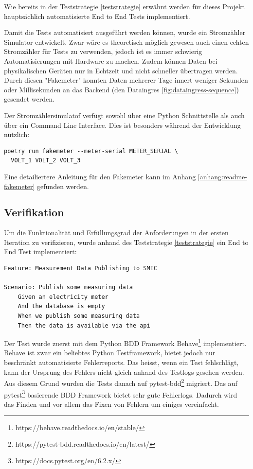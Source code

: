 Wie bereits in der Teststrategie \ref{teststrategie} erwähnt werden für dieses Projekt
hauptsächlich automatisierte End to End Tests implementiert.

Damit die Tests automatisiert ausgeführt werden können, wurde ein Stromzähler Simulator entwickelt.
Zwar wäre es theoretisch möglich gewesen auch einen echten Stromzähler für Tests zu verwenden,
jedoch ist es immer schwierig Automatisierungen mit Hardware zu machen. Zudem können
Daten bei physikalischen Geräten nur in Echtzeit und nicht schneller übertragen werden.
Durch diesen "Fakemeter" konnten Daten mehrerer Tage innert weniger Sekunden oder Millisekunden
an das Backend (den Dataingres \ref{fig:dataingress-sequence}) gesendet werden.

Der Stromzählersimulatof verfügt sowohl über eine Python Schnittstelle als auch über
ein Command Line Interface. Dies ist besonders während der Entwicklung nützlich:

\begin{verbatim}
poetry run fakemeter --meter-serial METER_SERIAL \
  VOLT_1 VOLT_2 VOLT_3
\end{verbatim}

Eine detailiertere Anleitung für den Fakemeter kann im Anhang \ref{anhang:readme-fakemeter}
gefunden werden.

\subsection{Verifikation}

Um die Funktionalität und Erfüllungsgrad der Anforderungen in der ersten Iteration zu verifizieren, wurde anhand
des Teststrategie \ref{teststrategie} ein End to End Test implementiert:


\begin{verbatim}
Feature: Measurement Data Publishing to SMIC

Scenario: Publish some measuring data
    Given an electricity meter
    And the database is empty
    When we publish some measuring data
    Then the data is available via the api
\end{verbatim}

Der Test wurde zuerst mit dem Python \ac{BDD} Framework Behave\footnote{https://behave.readthedocs.io/en/stable/}
implementiert. Behave ist zwar ein beliebtes Python Testframework, bietet jedoch nur
beschränkt automatisierte Fehlerreports. Das heisst, wenn ein Test fehlschlägt, kann der Ursprung
des Fehlers nicht gleich anhand des Testlogs gesehen werden.
Aus diesem Grund wurden die Tests danach auf pytest-bdd\footnote{https://pytest-bdd.readthedocs.io/en/latest/}
migriert. Das auf pytest\footnote{https://docs.pytest.org/en/6.2.x/} basierende \ac{BDD} Framework
bietet sehr gute Fehlerlogs. Dadurch wird das Finden und vor allem das Fixen von Fehlern
um einiges vereinfacht.


